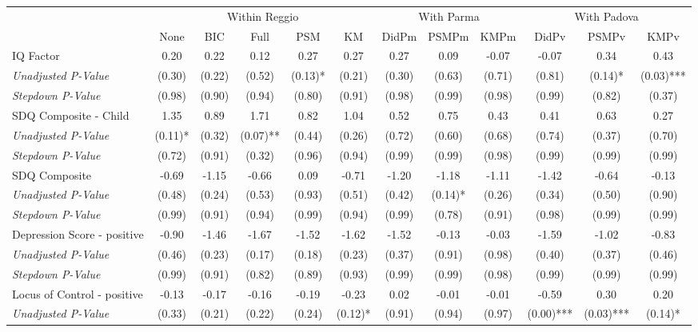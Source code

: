 \begin{tabular}{l c c c c c c c c c c c}
\toprule
& \multicolumn{5}{c}{Within Reggio} & \multicolumn{3}{c}{With Parma} & \multicolumn{3}{c}{With Padova} \\\cmidrule(lr){2-6} \cmidrule(lr){7-9} \cmidrule(lr){10-12}
 & None & BIC & Full & PSM & KM & DidPm & PSMPm & KMPm & DidPv & PSMPv & KMPv \\
\midrule
IQ Factor & 0.20 & 0.22 & 0.12 & 0.27 & 0.27 & 0.27 & 0.09 & -0.07 & -0.07 & 0.34 & 0.43 \\
\quad \textit{Unadjusted P-Value} & (0.30) & (0.22) & (0.52) & (0.13)* & (0.21) & (0.30) & (0.63) & (0.71) & (0.81) & (0.14)* & (0.03)*** \\
\quad \textit{Stepdown P-Value} & (0.98) & (0.90) & (0.94) & (0.80) & (0.91) & (0.98) & (0.99) & (0.98) & (0.99) & (0.82) & (0.37) \\
SDQ Composite - Child & 1.35 & 0.89 & 1.71 & 0.82 & 1.04 & 0.52 & 0.75 & 0.43 & 0.41 & 0.63 & 0.27 \\
\quad \textit{Unadjusted P-Value} & (0.11)* & (0.32) & (0.07)** & (0.44) & (0.26) & (0.72) & (0.60) & (0.68) & (0.74) & (0.37) & (0.70) \\
\quad \textit{Stepdown P-Value} & (0.72) & (0.91) & (0.32) & (0.96) & (0.94) & (0.99) & (0.99) & (0.98) & (0.99) & (0.99) & (0.99) \\
SDQ Composite & -0.69 & -1.15 & -0.66 & 0.09 & -0.71 & -1.20 & -1.18 & -1.11 & -1.42 & -0.64 & -0.13 \\
\quad \textit{Unadjusted P-Value} & (0.48) & (0.24) & (0.53) & (0.93) & (0.51) & (0.42) & (0.14)* & (0.26) & (0.34) & (0.50) & (0.90) \\
\quad \textit{Stepdown P-Value} & (0.99) & (0.91) & (0.94) & (0.99) & (0.94) & (0.99) & (0.78) & (0.91) & (0.98) & (0.99) & (0.99) \\
Depression Score - positive & -0.90 & -1.46 & -1.67 & -1.52 & -1.62 & -1.52 & -0.13 & -0.03 & -1.59 & -1.02 & -0.83 \\
\quad \textit{Unadjusted P-Value} & (0.46) & (0.23) & (0.17) & (0.18) & (0.23) & (0.37) & (0.91) & (0.98) & (0.40) & (0.37) & (0.46) \\
\quad \textit{Stepdown P-Value} & (0.99) & (0.91) & (0.82) & (0.89) & (0.93) & (0.99) & (0.99) & (0.98) & (0.99) & (0.99) & (0.99) \\
Locus of Control - positive & -0.13 & -0.17 & -0.16 & -0.19 & -0.23 & 0.02 & -0.01 & -0.01 & -0.59 & 0.30 & 0.20 \\
\quad \textit{Unadjusted P-Value} & (0.33) & (0.21) & (0.22) & (0.24) & (0.12)* & (0.91) & (0.94) & (0.97) & (0.00)*** & (0.03)*** & (0.14)* \\

\end{tabular}
